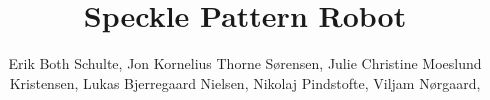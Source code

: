\title{Speckle Pattern Robot}

\author{
    Erik Both Schulte,
    Jon Kornelius Thorne Sørensen,
    Julie Christine Moeslund Kristensen,
    Lukas Bjerregaard Nielsen,
    Nikolaj Pindstofte,
    Viljam Nørgaard,
}

\newcommand{\institute}{Institut for Materialer og Produktion}
\newcommand{\semester}{2. semester}
\newcommand{\periodfrom}{03-02-2205}
\newcommand{\periodto}{23-05-2025}
\newcommand{\groupname}{4.020A}
\newcommand{\ectspoint}{10}
\newcommand{\suporvisor}{Niklas Kristian Kronborg Stagsted}
\newcommand{\frontpageimage}{\texttt{[image: Sections/5 Konceptgenerering/Media/Endelige løsning.png]}}
